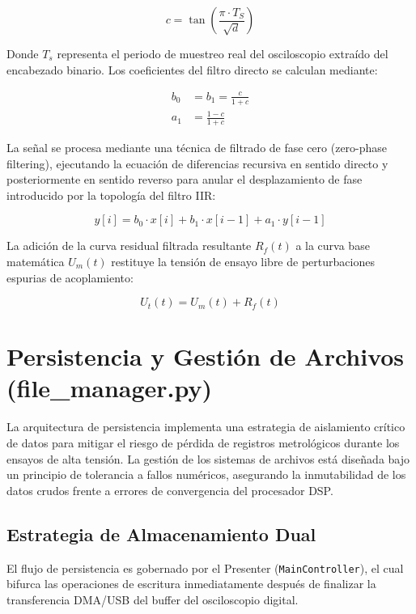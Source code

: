 \begin{equation}
c = \tan\left(\frac{\pi \cdot T_S}{\sqrt{d}}\right)
\end{equation}

Donde $T_s$ representa el periodo de muestreo real del osciloscopio extraído del encabezado binario. Los coeficientes del filtro directo se calculan mediante:

\begin{align*}
    b_0 &= b_1 = \frac{c}{1+c}\\
    a_1 &= \frac{1-c}{1+c}
\end{align*}

La señal se procesa mediante una técnica de filtrado de fase cero (zero-phase filtering), ejecutando la ecuación de diferencias recursiva en sentido directo y posteriormente en sentido reverso para anular el desplazamiento de fase introducido por la topología del filtro IIR:

\begin{equation}
    y[i] = b_0 \cdot x[i] + b_1 \cdot x[i-1] + a_1 \cdot y[i-1]
    \label{eq:ecuacion_filtro}
\end{equation}

La adición de la curva residual filtrada resultante $R_f(t)$ a la curva base matemática $U_m(t)$ restituye la tensión de ensayo libre de perturbaciones espurias de acoplamiento:

\begin{equation}
    U_t(t) = U_m(t)+ R_f(t)
\end{equation}

\section{Persistencia y Gestión de Archivos (file\_manager.py)}
La arquitectura de persistencia implementa una estrategia de aislamiento crítico de datos para mitigar el riesgo de pérdida de registros metrológicos durante los ensayos de alta tensión. La gestión de los sistemas de archivos está diseñada bajo un principio de tolerancia a fallos numéricos, asegurando la inmutabilidad de los datos crudos frente a errores de convergencia del procesador DSP.

\subsection{Estrategia de Almacenamiento Dual}
El flujo de persistencia es gobernado por el Presenter (\texttt{MainController}), el cual bifurca las operaciones de escritura inmediatamente después de finalizar la transferencia DMA/USB del buffer del osciloscopio digital.

